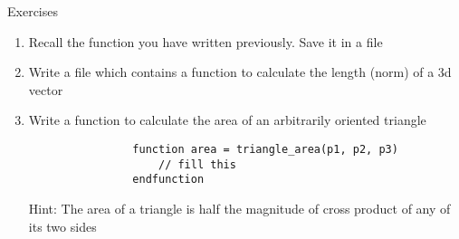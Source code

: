 \documentclass[%
    10pt,
    xcolor={dvipsnames},
    compress, %
]{beamer}
\newcommand{\hint}[1]{{\small\alert{Hint: #1}}}
\newcommand{\setitemsep}[1]{\setlength\itemsep{#1}}
\begin{document}
\begin{frame}[fragile]{Exercises}
    \begin{exercise}
        \begin{enumerate}
            \setitemsep{1em}
            \item Recall the  function you have written previously. Save it in a file 
            \item<2-> Write a file  which contains a function  to calculate the length (norm) of a 3d vector
            \item<3-> Write a function to calculate the area of an arbitrarily oriented triangle
            \begin{lstlisting}
                function area = triangle_area(p1, p2, p3)
                    // fill this
                endfunction
            \end{lstlisting}
            \hint{The area of a triangle is half the magnitude of cross product of any of its two sides}
        \end{enumerate}
    \end{exercise}
\end{frame}
\end{document}
